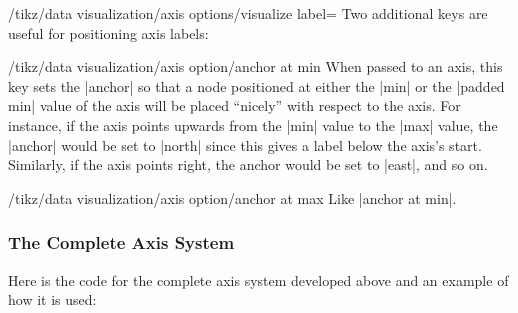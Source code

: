 \begin{key}{/tikz/data visualization/axis options/visualize label=}
  Two additional keys are useful for positioning axis labels:
  \begin{key}{/tikz/data visualization/axis option/anchor at min}
    When passed to an axis, this key sets the |anchor| so that a node
    positioned at either the |min| or the |padded min| value of the
    axis will be placed ``nicely'' with respect to the axis. For
    instance, if the axis points upwards from the |min| value to the
    |max| value, the |anchor| would be set to |north| since this gives
    a label below the axis's start. Similarly, if the axis points
    right, the anchor would be set to |east|, and so on.
  \end{key}
  \begin{key}{/tikz/data visualization/axis option/anchor at max}
    Like |anchor at min|.
  \end{key}
\end{key}


\subsubsection{The Complete Axis System}

Here is the code for the complete axis system developed above and an
example of how it is used:

